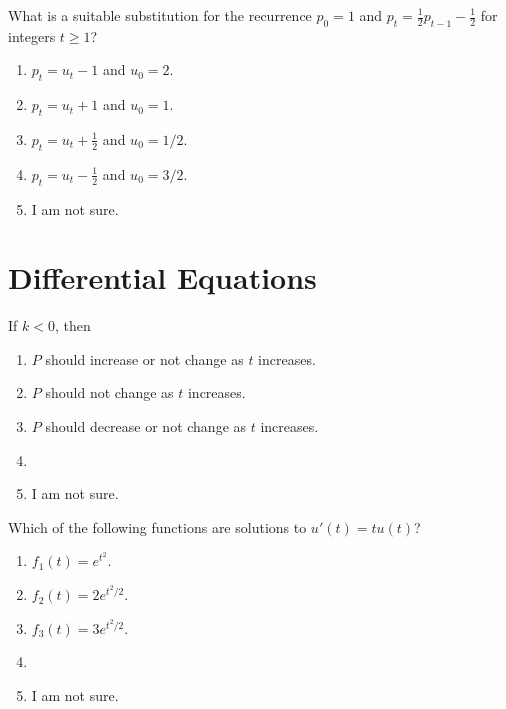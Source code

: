 \documentclass[aspectratio=169, t, 14pt]{beamer}
\begin{document}
\begin{frame}
  What is a suitable substitution for the recurrence \(p_{0} = 1\) and \(p_{t} = \tfrac{1}{2} p_{t-1} - \tfrac{1}{2}\) for integers \(t \ge 1\)?

  \begin{enumerate} 
    \item \(p_{t} = u_{t} - 1\) and \(u_{0} = 2\).
    \item \(p_{t} = u_{t} + 1\) and \(u_{0} = 1\).
    \item \(p_{t} = u_{t} + \frac{1}{2}\) and \(u_{0} = 1/2\).
    \item \(p_{t} = u_{t} - \frac{1}{2}\) and \(u_{0} = 3/2\).
    \item I am not sure. 
  \end{enumerate}
\end{frame}

\section{Differential Equations}

\begin{frame}
  If \(k < 0\), then 

  \begin{enumerate} 
    \item \(P\) should increase or not change as \(t\) increases.
    \item \(P\) should not change as \(t\) increases.
    \item \(P\) should decrease or not change as \(t\) increases.
    \item 
    \item I am not sure. 
  \end{enumerate}
\end{frame}

\begin{frame}
  Which of the following functions are solutions to \(u'(t) = tu(t)\)?

  \begin{enumerate} 
    \item \(f_{1}(t) = e^{t^{2}}\).
    \item \(f_{2}(t) = 2 e^{t^{2}/2}\).
    \item \(f_{3}(t) = 3 e^{t^{2}/2}\).
    \item 
    \item I am not sure. 
  \end{enumerate}
\end{frame}
\end{document}
